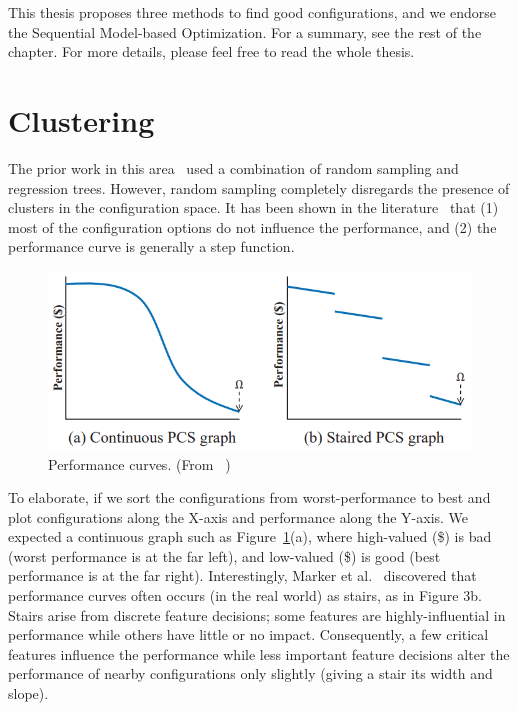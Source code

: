 This thesis proposes three methods to find good configurations, and we endorse the Sequential Model-based Optimization. For a summary, see the rest of the chapter. For more details, please feel free to read the whole thesis. 


\section{Clustering}
The prior work in this area~\cite{guo2013variability, sarkar2015cost} used a combination of random sampling and regression trees. However, random sampling completely disregards the presence of clusters in the configuration space. It has been shown in the literature~\cite{oh2017finding} that (1) most of the configuration options do not influence the performance, and (2) the performance curve is generally a step function. 

\begin{figure}[!htbp]
    \centering
    \includegraphics[width=0.8\linewidth]{Chapter-Introduction/Figures/stairs.png}
    \caption{Performance curves. (From ~\cite{oh2017finding})}
    \label{fig:chap1_stairs}
\end{figure}

To elaborate, if we sort the configurations from worst-performance to best and
plot configurations along the X-axis and performance along the
Y-axis. We expected a continuous graph
such as Figure~\ref{fig:chap1_stairs}(a), where high-valued (\$) is bad (worst performance is at the far left), and low-valued (\$) is good (best performance is at the
far right). Interestingly, Marker et al.~\cite{marker2014understanding} discovered that performance curves often occurs (in the real world) as stairs, as in Figure 3b. Stairs arise from discrete feature decisions;
some features are highly-influential in performance while others
have little or no impact. Consequently, a few critical features
influence the performance while less important feature decisions alter the performance of nearby configurations only slightly (giving a stair its width and slope).

